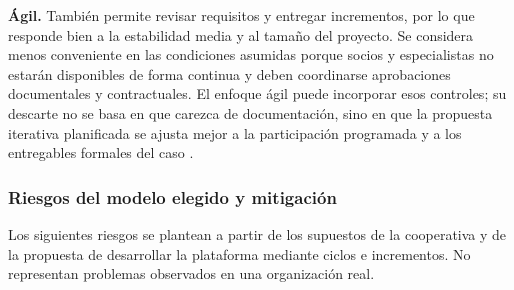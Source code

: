 \textbf{Ágil.} También permite revisar requisitos y entregar incrementos, por lo que responde bien a la estabilidad media y al tamaño del proyecto. Se considera menos conveniente en las condiciones asumidas porque socios y especialistas no estarán disponibles de forma continua y deben coordinarse aprobaciones documentales y contractuales. El enfoque ágil puede incorporar esos controles; su descarte no se basa en que carezca de documentación, sino en que la propuesta iterativa planificada se ajusta mejor a la participación programada y a los entregables formales del caso \cite{schon2017,turk2014}.

\subsubsection{Riesgos del modelo elegido y mitigación}

Los siguientes riesgos se plantean a partir de los supuestos de la cooperativa y de la propuesta de desarrollar la plataforma mediante ciclos e incrementos. No representan problemas observados en una organización real.

